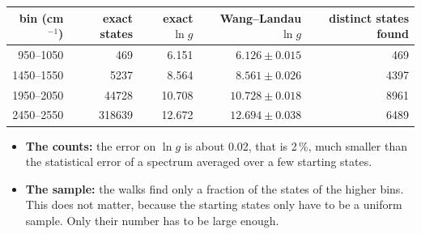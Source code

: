\begin{center}
\begin{tabular}{rrrrr}
bin (cm$^{-1}$) & exact states & exact $\ln g$ & Wang--Landau $\ln g$ & distinct states found \\
\hline
950--1050 & 469 & 6.151 & $6.126\pm0.015$ & 469 \\
1450--1550 & 5237 & 8.564 & $8.561\pm0.026$ & 4397 \\
1950--2050 & 44728 & 10.708 & $10.728\pm0.018$ & 8961 \\
2450--2550 & 318639 & 12.672 & $12.694\pm0.038$ & 6489 \\
\end{tabular}
\end{center}

\begin{itemize}
\item \textbf{The counts:} the error on $\ln g$ is about 0.02, that is
2\,\%, much smaller than the statistical error of a spectrum averaged over
a few starting states.
\item \textbf{The sample:} the walks find only a fraction of the states of
the higher bins. This does not matter, because the starting states only
have to be a uniform sample. Only their number has to be large enough.
\end{itemize}

